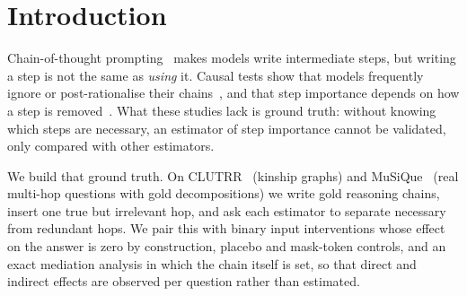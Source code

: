 \documentclass[11pt]{article}
\begin{document}
\section{Introduction}
Chain-of-thought prompting~\citep{wei2022cot} makes models write intermediate steps, but writing a
step is not the same as \emph{using} it. Causal tests show that models frequently ignore or
post-rationalise their chains~\citep{lanham2023faithfulness,turpin2023unfaithful,paul2024frodo,
tutek2025fur}, and that step importance depends on how a step is removed~\citep{bogdan2025anchors,
macar2026branches}. What these studies lack is ground truth: without knowing which steps are
necessary, an estimator of step importance cannot be validated, only compared with other
estimators.

We build that ground truth. On CLUTRR~\citep{sinha2019clutrr} (kinship graphs) and
MuSiQue~\citep{trivedi2022musique} (real multi-hop questions with gold decompositions) we write gold
reasoning chains, insert one true but irrelevant hop, and ask each estimator to separate necessary
from redundant hops. We pair this with binary input interventions whose effect on the answer is
zero by construction, placebo and mask-token controls, and an exact mediation analysis in which the
chain itself is set, so that direct and indirect effects are observed per question rather than
estimated.
\end{document}
